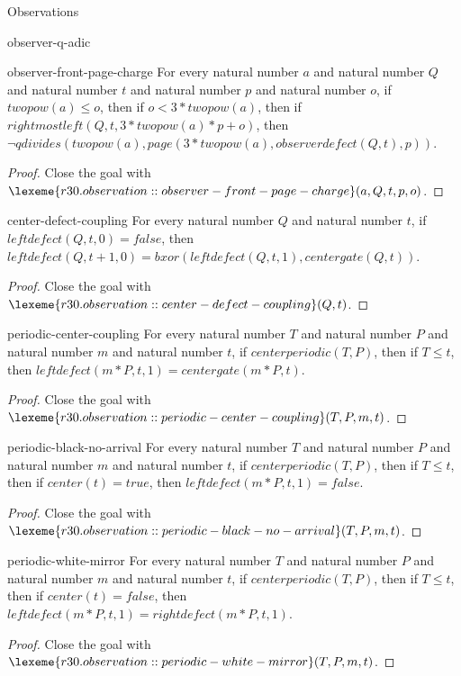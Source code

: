\begin{lexlean}{Observations}
\begin{section}{observer-q-adic}
\begin{theorem}{observer-front-page-charge}
For every natural number \(a\) and natural number \(Q\) and natural number \(t\) and natural number \(p\) and natural number \(o\), if \(twopow(a) ≤ o\), then if \(o < 3 * twopow(a)\), then if \(rightmostleft(Q, t, 3 * twopow(a) * p + o)\), then \(¬ qdivides(twopow(a), page(3 * twopow(a), observerdefect(Q, t), p))\).
\begin{proof}
Close the goal with \(\lexeme{r30.observation::observer-front-page-charge}(a, Q, t, p, o)\).
\end{proof}
\end{theorem}

\begin{theorem}{center-defect-coupling}
For every natural number \(Q\) and natural number \(t\), if \(leftdefect(Q, t, 0) = false\), then \(leftdefect(Q, t + 1, 0) = bxor(leftdefect(Q, t, 1), centergate(Q, t))\).
\begin{proof}
Close the goal with \(\lexeme{r30.observation::center-defect-coupling}(Q, t)\).
\end{proof}
\end{theorem}

\begin{theorem}{periodic-center-coupling}
For every natural number \(T\) and natural number \(P\) and natural number \(m\) and natural number \(t\), if \(centerperiodic(T, P)\), then if \(T ≤ t\), then \(leftdefect(m * P, t, 1) = centergate(m * P, t)\).
\begin{proof}
Close the goal with \(\lexeme{r30.observation::periodic-center-coupling}(T, P, m, t)\).
\end{proof}
\end{theorem}

\begin{theorem}{periodic-black-no-arrival}
For every natural number \(T\) and natural number \(P\) and natural number \(m\) and natural number \(t\), if \(centerperiodic(T, P)\), then if \(T ≤ t\), then if \(center(t) = true\), then \(leftdefect(m * P, t, 1) = false\).
\begin{proof}
Close the goal with \(\lexeme{r30.observation::periodic-black-no-arrival}(T, P, m, t)\).
\end{proof}
\end{theorem}

\begin{theorem}{periodic-white-mirror}
For every natural number \(T\) and natural number \(P\) and natural number \(m\) and natural number \(t\), if \(centerperiodic(T, P)\), then if \(T ≤ t\), then if \(center(t) = false\), then \(leftdefect(m * P, t, 1) = rightdefect(m * P, t, 1)\).
\begin{proof}
Close the goal with \(\lexeme{r30.observation::periodic-white-mirror}(T, P, m, t)\).
\end{proof}
\end{theorem}


\end{section}
\end{lexlean}
